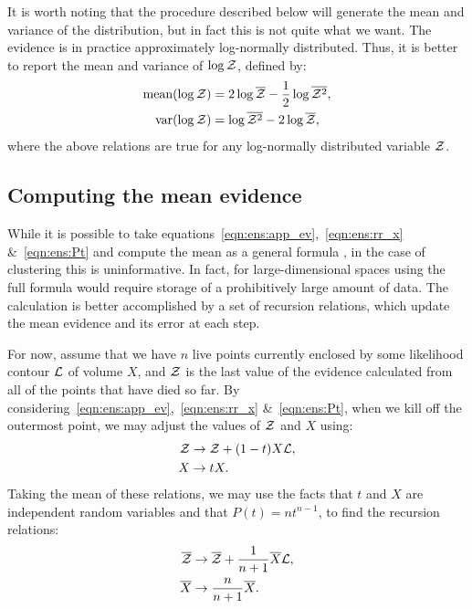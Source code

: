 It is worth noting that the procedure described below will generate the mean and variance of the distribution, but in fact this is not quite what we want. The evidence is in practice approximately log-normally distributed. Thus, it is better to report the mean and variance of \(\log\mathcal{Z}\), defined by:
\begin{align}
  \text{mean}(\log\mathcal{Z}) &= 2\log\overline{\mathcal{Z}} - \frac{1}{2}\log\overline{\mathcal{Z}^2},\\
  \text{var}(\log\mathcal{Z}) &= \log\overline{\mathcal{Z}^2}-2\log\overline{\mathcal{Z}},
\end{align}
where the above relations are true for any log-normally distributed variable \(\mathcal{Z}\).


\subsection{Computing the mean evidence}
\label{sec:ens:basic_mean}

While it is possible to take equations~\eqref{eqn:ens:app_ev},~\eqref{eqn:ens:rr_x} \&~\eqref{eqn:ens:Pt} and compute the mean as a general formula \citep{Keeton}, in the case of clustering this is uninformative. 
In fact, for large-dimensional spaces using the full formula would require storage of a prohibitively large amount of data. The calculation is better accomplished by a set of recursion relations, which update the mean evidence and its error at each step. 

For now, assume that we have \(n\) live points currently enclosed by some likelihood contour \(\mathcal{L}\) of volume \(X\), and \(\mathcal{Z}\) is the last value of the evidence calculated from all of the points that have died so far. By considering~\eqref{eqn:ens:app_ev},~\eqref{eqn:ens:rr_x} \&~\eqref{eqn:ens:Pt}, when we kill off the outermost point, we may adjust the values of \(\mathcal{Z}\) and \(X\) using:
%
\begin{align}                                                         
\mathcal{Z} &\to \mathcal{Z} + (1-t)X\mathcal{L},
\label{eqn:ens:rr_Z}
\\
X &\to tX.
\label{eqn:ens:rr_X}
\end{align}
%
Taking the mean of these relations, we may use the facts that \(t\) and \(X\) are independent random variables and that \(P(t) = n t^{n-1}\), to find the recursion relations:
\begin{align}
  \overline{\mathcal{Z}} &\to \overline{\mathcal{Z}} + \frac{1}{n+1}\overline{X}\mathcal{L},
  \label{eqn:ens:rr_Zb}
  \\
  \overline{X} &\to \frac{n}{n+1}\overline{X}.
  \label{eqn:ens:rr_Xb}
\end{align}
%

